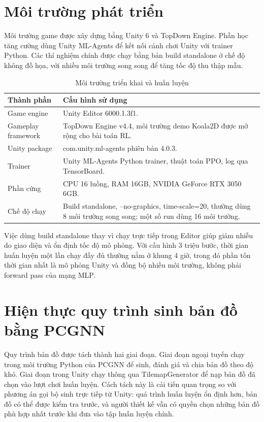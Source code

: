 \section{Môi trường phát triển}

Môi trường game được xây dựng bằng Unity 6 và TopDown Engine. Phần học tăng cường dùng Unity ML-Agents để kết nối cảnh chơi Unity với trainer Python. Các thí nghiệm chính được chạy bằng bản build standalone ở chế độ không đồ họa, với nhiều môi trường song song để tăng tốc độ thu thập mẫu.

\begin{table}[H]
    \centering
    \small
    \caption{Môi trường triển khai và huấn luyện}
    \label{tab:development_environment}
    \begin{tabular}{|p{5cm}|p{8cm}|}
        \hline
        \textbf{Thành phần} & \textbf{Cấu hình sử dụng} \\
        \hline
        Game engine & Unity Editor 6000.1.3f1. \\
        \hline
        Gameplay framework & TopDown Engine v4.4, môi trường demo Koala2D được mở rộng cho bài toán RL. \\
        \hline
        Unity package & com.unity.ml-agents phiên bản 4.0.3. \\
        \hline
        Trainer & Unity ML-Agents Python trainer, thuật toán PPO, log qua TensorBoard. \\
        \hline
        Phần cứng & CPU 16 luồng, RAM 16GB, NVIDIA GeForce RTX 3050 6GB. \\
        \hline
        Chế độ chạy & Build standalone, --no-graphics, time-scale=20, thường dùng 8 môi trường song song; một số run dùng 16 môi trường. \\
        \hline
    \end{tabular}
\end{table}

Việc dùng build standalone thay vì chạy trực tiếp trong Editor giúp giảm nhiễu do giao diện và ổn định tốc độ mô phỏng. Với cấu hình 3 triệu bước, thời gian huấn luyện một lần chạy đầy đủ thường nằm ở khung 4 giờ, trong đó phần tốn thời gian nhất là mô phỏng Unity và đồng bộ nhiều môi trường, không phải forward pass của mạng MLP.

\section{Hiện thực quy trình sinh bản đồ bằng PCGNN}

Quy trình bản đồ được tách thành hai giai đoạn. Giai đoạn ngoại tuyến chạy trong môi trường Python của PCGNN để sinh, đánh giá và chia bản đồ theo độ khó. Giai đoạn trong Unity chạy thông qua TilemapGenerator để nạp bản đồ đã chọn vào lượt chơi huấn luyện. Cách tách này là cải tiến quan trọng so với phương án gọi bộ sinh trực tiếp từ Unity: quá trình huấn luyện ổn định hơn, bản đồ có thể được kiểm tra trước, và người thiết kế vẫn có quyền chọn những bản đồ phù hợp nhất trước khi đưa vào tập huấn luyện chính.

